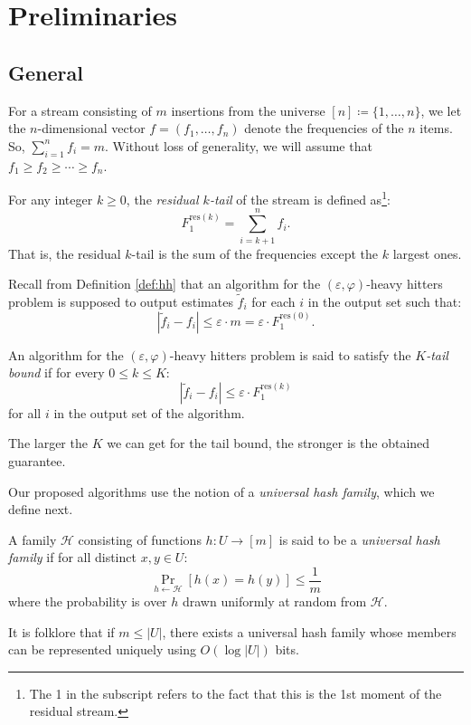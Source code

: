 \documentclass[sigconf,review=true,anonymous=true,screen]{acmart}
\newcommand{\eps}{\varepsilon}
\begin{document}
    \section{Preliminaries}
    \subsection{General}
For a stream consisting of $m$ insertions from the universe $[n] \coloneqq \{1,\dots, n\}$, we let the $n$-dimensional vector $f = (f_1, \dots, f_n)$
denote the frequencies of the $n$ items. So, $\sum_{i=1}^n f_i = m$. Without loss of generality, we will assume that $f_1 \geq f_2 \geq \cdots \geq f_n$. 

For any integer $k \geq 0$, the {\em residual $k$-tail} of the stream is defined as\footnote{The 1 in the subscript refers to the fact that this is the 1st moment of the residual stream.}:
$$F_1^{\text{res}(k)} = \sum_{i=k+1}^n f_i.$$
That is, the residual $k$-tail is the sum of the frequencies except the $k$ largest ones. 

Recall from Definition \ref{def:hh} that an algorithm for the $(\eps, \varphi)$-heavy hitters problem is supposed to output estimates $\tilde{f}_i$ for each $i$ in the output set such that:
$$|\tilde{f}_i - f_i| \leq \eps \cdot m = \eps\cdot F_1^{\text{res}(0)}.$$
\begin{definition}\label{def:tailbd}
An algorithm for the $(\eps,\varphi)$-heavy hitters problem is said to satisfy the {\em $K$-tail bound} if for every $0\leq k\leq K$:
$$|\tilde{f}_i - f_i| \leq \eps \cdot F_1^{\text{res}(k)}$$
for all $i$ in the output set of the algorithm.
\end{definition}
The larger the $K$ we can get for the tail bound, the stronger is the obtained guarantee. 


Our proposed algorithms use the notion of a {\em universal hash family}, which we define next.
\begin{definition}
A family $\mathcal{H}$ consisting of functions $h: U \to [m]$ is said to be a {\em universal hash family} if 
for all distinct $x, y \in U$:
$$\Pr_{h \leftarrow \mathcal{H}}[h(x)=h(y)] \leq \frac1m$$
where the probability is over $h$ drawn uniformly at random from $\mathcal{H}$. 
\end{definition}
It is folklore that if $m \leq |U|$, there exists a universal hash family whose members can be represented uniquely using $O(\log |U|)$ bits.
\end{document}
